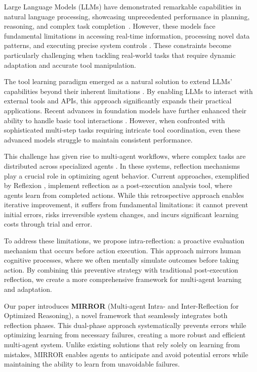 \documentclass{article}
\begin{document}
Large Language Models (LLMs) have demonstrated remarkable capabilities in natural language processing, showcasing unprecedented performance in planning, reasoning, and complex task completion~\cite{brown2020:language,chen2022:program,sun2023survey,yang2023foundation,touvron2023llama}. However, these models face fundamental limitations in accessing real-time information, processing novel data patterns, and executing precise system controls \cite{petroni2020kilt,lewis2020retrieval,komeili2021internet,zhang2022opt}. These constraints become particularly challenging when tackling real-world tasks that require dynamic adaptation and accurate tool manipulation.

The tool learning paradigm emerged as a natural solution to extend LLMs' capabilities beyond their inherent limitations \cite{qin2023toolllm}. By enabling LLMs to interact with external tools and APIs, this approach significantly expands their practical applications. 
Recent advances in foundation models have further enhanced their ability to handle basic tool interactions \cite{achiam2023gpt,team2023gemini,dubey2024llama,qwen2.5}. However, when confronted with sophisticated multi-step tasks requiring intricate tool coordination, even these advanced models struggle to maintain consistent performance.

This challenge has given rise to multi-agent workflows, where complex tasks are distributed across specialized agents \cite{wu2023autogen,hong2024metagpt,opendevin}. In these systems, reflection mechanisms play a crucial role in optimizing agent behavior. Current approaches, exemplified by Reflexion \cite{shinn2024reflexion}, implement reflection as a post-execution analysis tool, where agents learn from completed actions. While this retrospective approach enables iterative improvement, it suffers from fundamental limitations: it cannot prevent initial errors, risks irreversible system changes, and incurs significant learning costs through trial and error.

To address these limitations, we propose intra-reflection: a proactive evaluation mechanism that occurs before action execution. This approach mirrors human cognitive processes, where we often mentally simulate outcomes before taking action. By combining this preventive strategy with traditional post-execution reflection, we create a more comprehensive framework for multi-agent learning and adaptation.

Our paper introduces \textbf{MIRROR} (Multi-agent Intra- and Inter-Reflection for Optimized Reasoning), a novel framework that seamlessly integrates both reflection phases. This dual-phase approach systematically prevents errors while optimizing learning from necessary failures, creating a more robust and efficient multi-agent system. Unlike existing solutions that rely solely on learning from mistakes, MIRROR enables agents to anticipate and avoid potential errors while maintaining the ability to learn from unavoidable failures.
\end{document}

